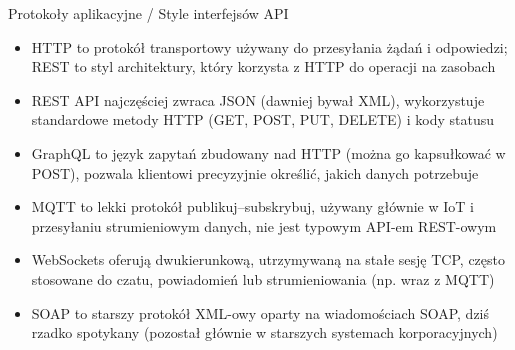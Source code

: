 \documentclass[10pt,compress,usenames,dvipsnames,aspectratio=169]{beamer}
\begin{document}
\begin{frame}{Protokoły aplikacyjne / Style interfejsów API}
  \begin{itemize}
    \item HTTP to protokół transportowy używany do przesyłania żądań i odpowiedzi; REST to styl architektury, który korzysta z HTTP do operacji na zasobach
    \item REST API najczęściej zwraca JSON (dawniej bywał XML), wykorzystuje standardowe metody HTTP (GET, POST, PUT, DELETE) i kody statusu
    \item GraphQL to język zapytań zbudowany nad HTTP (można go kapsułkować w POST), pozwala klientowi precyzyjnie określić, jakich danych potrzebuje
    \item MQTT to lekki protokół publikuj–subskrybuj, używany głównie w IoT i przesyłaniu strumieniowym danych, nie jest typowym API-em REST-owym
    \item WebSockets oferują dwukierunkową, utrzymywaną na stałe sesję TCP, często stosowane do czatu, powiadomień lub strumieniowania (np. wraz z MQTT)
    \item SOAP to starszy protokół XML-owy oparty na wiadomościach SOAP, dziś rzadko spotykany (pozostał głównie w starszych systemach korporacyjnych)
  \end{itemize}
\end{frame}
\end{document}

